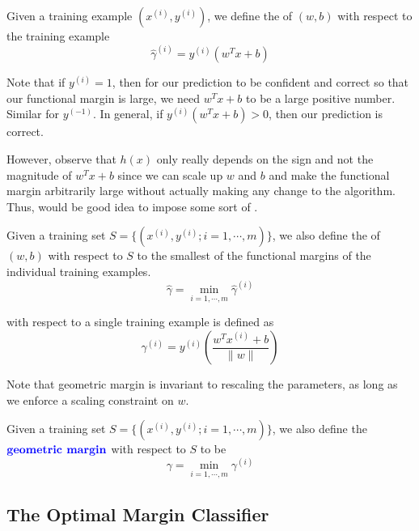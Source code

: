 \documentclass[12pt]{scrartcl}
\begin{document}
\begin{definition}
    Given a training example $(x^{(i)}, y^{(i)})$, we define the  of $(w,b)$ with respect to the training example
    \[\hat \gamma^{(i)} = y^{(i)}(w^Tx + b)\]
\end{definition}

\begin{note}
    Note that if $y^{(i)} = 1$, then for our prediction to be confident and correct so that our functional margin is large, we need $w^Tx + b$ to be a large positive number. Similar for $y^{(-1)}$. In general, if $y^{(i)}(w^Tx + b) > 0$, then our prediction is correct.
\end{note}

However, observe that $h(x)$ only really depends on the sign and not the
magnitude of $w^Tx+b$ since we can scale up $w$ and $b$ and make the functional
margin arbitrarily large without actually making any change to the algorithm.
Thus, would be good idea to impose some sort of .

\begin{definition}
    Given a training set $S = \{(x^{(i)}, y^{(i)}; i = 1, \cdots, m)\}$, we also define the  of $(w,b)$ with respect to $S$ to the smallest of the functional margins of the individual training examples.
    \[\hat \gamma = \underset{i = 1, \cdots, m}{\min}\hat \gamma^{(i)}\]
\end{definition}

\begin{definition}
     with respect to a single training example is defined as
    \[\gamma^{(i)} = y^{(i)}\left(\frac{w^Tx^{(i)} + b}{\lVert w\rVert}\right)\]
\end{definition}

\begin{note}
    Note that geometric margin is invariant to rescaling the parameters, as long as we enforce a scaling constraint on $w$.
\end{note}

\begin{definition}
    Given a training set $S = \{(x^{(i)}, y^{(i)}; i = 1, \cdots, m)\}$, we also define the $\textbf{\color{blue} geometric margin}$ with respect to $S$ to be
    \[\gamma = \underset{i = 1, \cdots, m}{\min}\gamma^{(i)}\]
\end{definition}

\subsection{The Optimal Margin Classifier}
\end{document}
